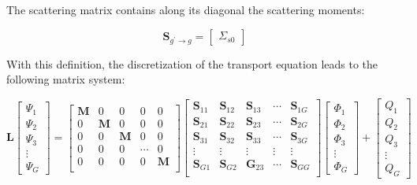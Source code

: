 \documentclass[10pt]{article}
\begin{document}
The scattering matrix contains along its diagonal the scattering moments:

\begin{equation}
\textbf{S}_{g^{'}\rightarrow g}=\begin{bmatrix}
\Sigma_{s0}
\end{bmatrix}
\end{equation}

With this definition, the discretization of the transport equation leads to the following matrix system:

\begin{equation}
\textbf{L}\begin{bmatrix}\Psi_1\\\Psi_2\\\Psi_3\\\vdots\\\Psi_G\end{bmatrix}=
\begin{bmatrix}
\textbf{M} & 0 & 0 & 0 & 0\\
0 & \textbf{M} & 0 & 0 & 0\\
0 & 0 & \textbf{M} & 0 & 0\\
0 & 0 & 0 & \cdots & 0\\
0 & 0 & 0 & 0 & \textbf{M}\\
\end{bmatrix}
\begin{bmatrix}
\textbf{S}_{11} & \textbf{S}_{12} & \textbf{S}_{13} & \cdots & \textbf{S}_{1G}\\
\textbf{S}_{21} & \textbf{S}_{22} & \textbf{S}_{23} & \cdots & \textbf{S}_{2G}\\
\textbf{S}_{31} & \textbf{S}_{32} & \textbf{S}_{33} & \cdots & \textbf{S}_{3G}\\
\vdots & \vdots & \vdots & \vdots & \vdots\\
\textbf{S}_{G1} & \textbf{S}_{G2} & \textbf{G}_{23} & \cdots & \textbf{S}_{GG}\\
\end{bmatrix}
\begin{bmatrix}
\Phi_1\\\Phi_2\\\Phi_3\\\vdots\\\Phi_G
\end{bmatrix}
+
\begin{bmatrix}
Q_1\\Q_2\\Q_3\\\vdots\\Q_G
\end{bmatrix}
\end{equation}
\end{document}
